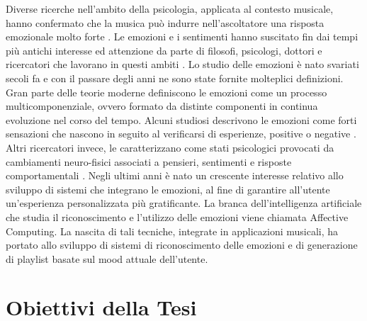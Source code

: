 \documentclass[11pt]{report}
\begin{document}
Diverse ricerche nell'ambito della psicologia, applicata al contesto musicale, hanno confermato che la musica può indurre nell'ascoltatore una risposta emozionale molto forte \cite{Krumhansl}\cite{Mitterschiffthaler2007Nov}\cite{Charlotte}. Le emozioni e i sentimenti hanno suscitato fin dai tempi più antichi interesse ed attenzione da parte di filosofi, psicologi, dottori e ricercatori che lavorano in questi ambiti \cite{Barrett2006Mar}. Lo studio delle emozioni è nato svariati secoli fa e con il passare degli anni ne sono state fornite molteplici definizioni. Gran parte delle teorie moderne definiscono le emozioni come un processo multicomponenziale, ovvero formato da distinte componenti in continua evoluzione nel corso del tempo. Alcuni studiosi descrivono le emozioni come forti sensazioni che nascono in seguito al verificarsi di esperienze, positive o negative \cite{knuuttila2004emotions}. Altri ricercatori invece, le caratterizzano come stati psicologici provocati da cambiamenti neuro-fisici associati a pensieri, sentimenti e risposte comportamentali \cite{Chaturvedi2022Feb}. Negli ultimi anni è nato un crescente interesse relativo allo sviluppo di sistemi che integrano le emozioni, al fine di garantire all'utente un'esperienza personalizzata più gratificante. La branca dell'intelligenza artificiale che studia il riconoscimento e l'utilizzo delle emozioni viene chiamata Affective Computing\cite{picard2000affective}. La nascita di tali tecniche, integrate in applicazioni musicali, ha portato allo sviluppo di sistemi di riconoscimento delle emozioni e di generazione di playlist basate sul mood attuale dell'utente.

\section{Obiettivi della Tesi}
\end{document}
